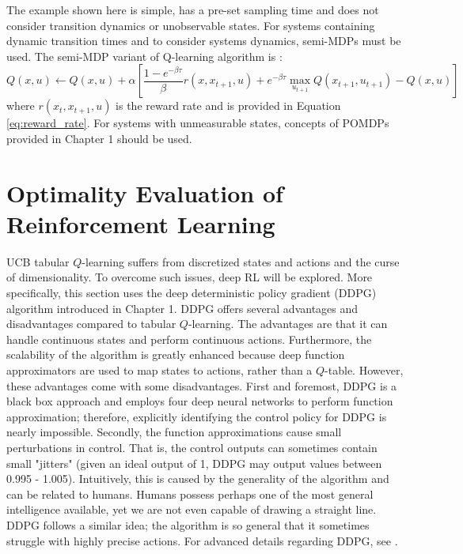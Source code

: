 The example shown here is simple, has a pre-set sampling time and does not consider transition dynamics or unobservable states. For systems containing dynamic transition times and to consider systems dynamics, semi-MDPs must be used.  The semi-MDP variant of Q-learning algorithm is \cite{continuous_rl_ref14}:
\begin{equation}
    Q(x, u) \leftarrow Q(x, u) + \alpha \left[\frac{1 - e^{-\beta \tau}}{\beta}r(x, x_{t+1}, u) + e^{-\beta \tau} \max_{u_{t+1}}Q(x_{t+1}, u_{t+1}) - Q(x, u) \right]
\end{equation}
where $r(x_t, x_{t+1}, u)$ is the reward rate and is provided in Equation \ref{eq:reward_rate}. For systems with unmeasurable states, concepts of POMDPs provided in Chapter 1 should be used.






















\section{Optimality Evaluation of Reinforcement Learning}
UCB tabular $Q$-learning suffers from discretized states and actions and the curse of dimensionality.  To overcome such issues, deep RL will be explored.  More specifically, this section uses the deep deterministic policy gradient (DDPG) algorithm introduced in Chapter 1. DDPG offers several advantages and disadvantages compared to tabular $Q$-learning.  The advantages are that it can handle continuous states and perform continuous actions. Furthermore, the scalability of the algorithm is greatly enhanced because deep function approximators are used to map states to actions, rather than a $Q$-table. However, these advantages come with some disadvantages.  First and foremost, DDPG is a black box approach and employs four deep neural networks to perform function approximation; therefore, explicitly identifying the control policy for DDPG is nearly impossible. Secondly, the function approximations cause small perturbations in control.  That is, the control outputs can sometimes contain small "jitters" (given an ideal output of 1, DDPG may output values between 0.995 - 1.005).  Intuitively, this is caused by the generality of the algorithm and can be related to humans.  Humans possess perhaps one of the most general intelligence available, yet we are not even capable of drawing a straight line. DDPG follows a similar idea; the algorithm is so general that it sometimes struggle with highly precise actions. For advanced details regarding DDPG, see \cite{ddpg}.  

